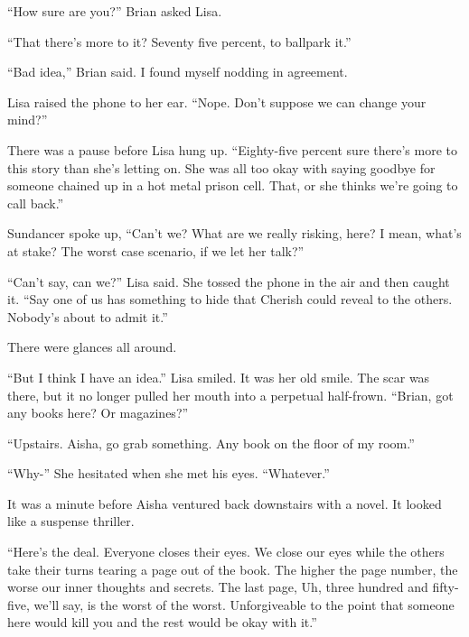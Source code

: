 ``How sure are you?'' Brian asked Lisa.



``That there's more to it?  Seventy five percent, to ballpark it.''



``Bad idea,'' Brian said.  I found myself nodding in agreement.



Lisa raised the phone to her ear.  ``Nope.  Don't suppose we can change your mind?''



There was a pause before Lisa hung up.  ``Eighty-five percent sure there's more to this story than she's letting on.  She was all too okay with saying goodbye for someone chained up in a hot metal prison cell.  That, or she thinks we're going to call back.''



Sundancer spoke up, ``Can't we?  What are we really risking, here?  I mean, what's at stake?  The worst case scenario, if we let her talk?''



``Can't say, can we?'' Lisa said.  She tossed the phone in the air and then caught it.  ``Say one of us has something to hide that Cherish could reveal to the others.  Nobody's about to admit it.''



There were glances all around.



``But I think I have an idea.''  Lisa smiled.  It was her old smile.  The scar was there, but it no longer pulled her mouth into a perpetual half-frown.  ``Brian, got any books here?  Or magazines?''



``Upstairs.  Aisha, go grab something.  Any book on the floor of my room.''



``Why-''  She hesitated when she met his eyes.  ``Whatever.''



It was a minute before Aisha ventured back downstairs with a novel.  It looked like a suspense thriller.



``Here's the deal.  Everyone closes their eyes.  We close our eyes while the others take their turns tearing a page out of the book.  The higher the page number, the worse our inner thoughts and secrets.  The last page, Uh, three hundred and fifty-five, we'll say, is the worst of the worst.  Unforgiveable to the point that someone here would kill you and the rest would be okay with it.''



